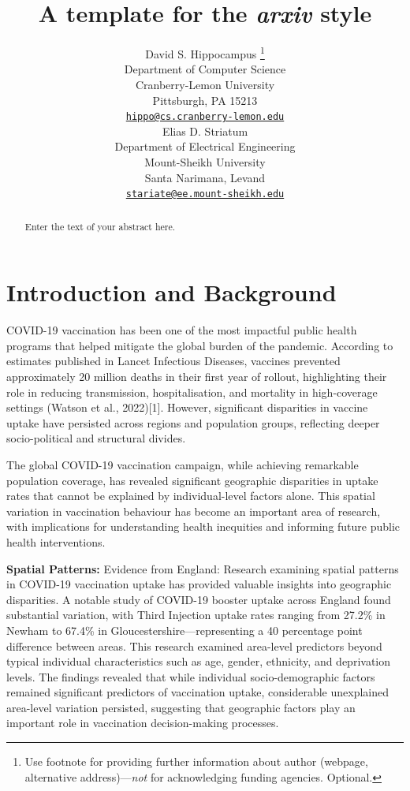 \documentclass{article}
\title{A template for the \emph{arxiv} style}
\author{
    David S. Hippocampus
    \thanks{Use footnote for providing further information about author
(webpage, alternative address)---\emph{not} for acknowledging funding
agencies. Optional.}
   \\
    Department of Computer Science \\
    Cranberry-Lemon University \\
  Pittsburgh, PA 15213 \\
  \texttt{\href{mailto:hippo@cs.cranberry-lemon.edu}{\nolinkurl{hippo@cs.cranberry-lemon.edu}}} \\
   \And
    Elias D. Striatum
   \\
    Department of Electrical Engineering \\
    Mount-Sheikh University \\
  Santa Narimana, Levand \\
  \texttt{\href{mailto:stariate@ee.mount-sheikh.edu}{\nolinkurl{stariate@ee.mount-sheikh.edu}}} \\
  }
\begin{document}
\maketitle


\begin{abstract}
Enter the text of your abstract here.
\end{abstract}


\section{Introduction and Background}\label{introduction-and-background}

COVID-19 vaccination has been one of the most impactful public health
programs that helped mitigate the global burden of the pandemic.
According to estimates published in Lancet Infectious Diseases, vaccines
prevented approximately 20 million deaths in their first year of
rollout, highlighting their role in reducing transmission,
hospitalisation, and mortality in high-coverage settings (Watson et al.,
2022){[}1{]}. However, significant disparities in vaccine uptake have
persisted across regions and population groups, reflecting deeper
socio-political and structural divides.

The global COVID-19 vaccination campaign, while achieving remarkable
population coverage, has revealed significant geographic disparities in
uptake rates that cannot be explained by individual-level factors alone.
This spatial variation in vaccination behaviour has become an important
area of research, with implications for understanding health inequities
and informing future public health interventions.

\textbf{Spatial Patterns:} Evidence from England: Research examining
spatial patterns in COVID-19 vaccination uptake has provided valuable
insights into geographic disparities. A notable study of COVID-19
booster uptake across England found substantial variation, with Third
Injection uptake rates ranging from 27.2\% in Newham to 67.4\% in
Gloucestershire---representing a 40 percentage point difference between
areas. This research examined area-level predictors beyond typical
individual characteristics such as age, gender, ethnicity, and
deprivation levels. The findings revealed that while individual
socio-demographic factors remained significant predictors of vaccination
uptake, considerable unexplained area-level variation persisted,
suggesting that geographic factors play an important role in vaccination
decision-making processes.
\end{document}
